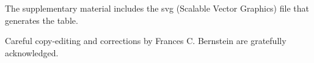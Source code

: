 \documentclass[preprint]{iucr}              %
\numberwithin{equation}{section}
\begin{document}
The supplementary material includes the 
svg (Scalable Vector Graphics) file that generates the table.
	
	
	
	
	
	Careful copy-editing and corrections by Frances C. Bernstein are 
	gratefully acknowledged.

	
	
	
	
	
	
	
	
	
	
	
	
	
\end{document}
